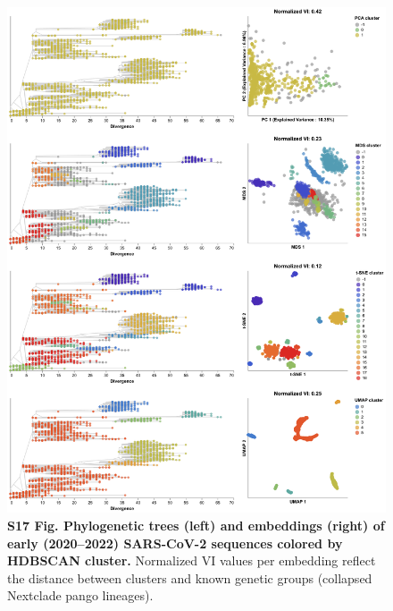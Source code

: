 \documentclass[10pt,letterpaper]{article}
\begin{document}
\begin{figure}[!h]
\includegraphics[width=\columnwidth]{figures/sarscov2-embeddings-by-cluster-vs-Nextclade_pango_collapsed.png}
\caption*{{\bf S17 Fig. Phylogenetic trees (left) and embeddings (right) of early (2020--2022) SARS-CoV-2 sequences colored by HDBSCAN cluster.}
  Normalized VI values per embedding reflect the distance between clusters and known genetic groups (collapsed Nextclade pango lineages).
}
\end{figure}
\end{document}
